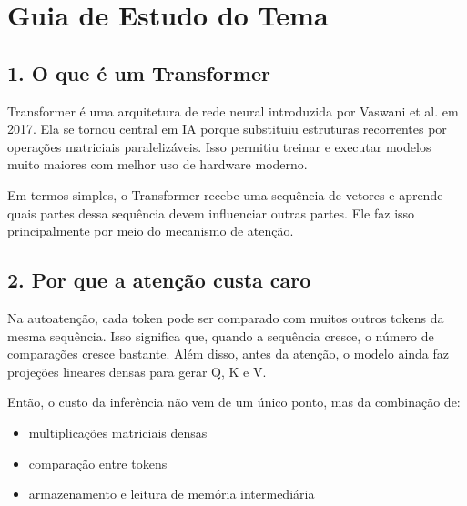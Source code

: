 

\chapter{Guia de Estudo do Tema}



\section{1. O que é um Transformer}





Transformer é uma arquitetura de rede neural introduzida por Vaswani et al. em 2017. Ela se tornou central em IA porque substituiu estruturas recorrentes por operações matriciais paralelizáveis. Isso permitiu treinar e executar modelos muito maiores com melhor uso de hardware moderno.




Em termos simples, o Transformer recebe uma sequência de vetores e aprende quais partes dessa sequência devem influenciar outras partes. Ele faz isso principalmente por meio do mecanismo de atenção.



\section{2. Por que a atenção custa caro}





Na autoatenção, cada token pode ser comparado com muitos outros tokens da mesma sequência. Isso significa que, quando a sequência cresce, o número de comparações cresce bastante. Além disso, antes da atenção, o modelo ainda faz projeções lineares densas para gerar Q, K e V.



Então, o custo da inferência não vem de um único ponto, mas da combinação de:

\begin{itemize}
\item multiplicações matriciais densas
\item comparação entre tokens
\item armazenamento e leitura de memória intermediária
\end{itemize}


